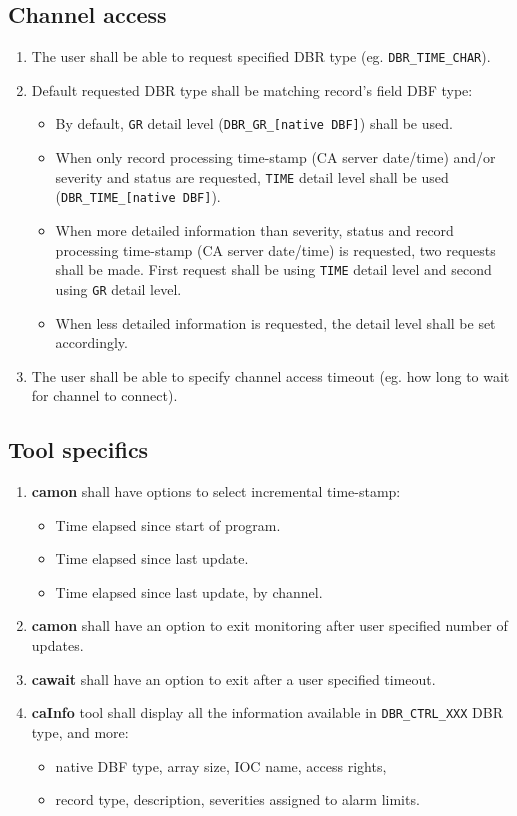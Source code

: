 \documentclass[12pt,a4paper]{article}
\begin{document}
\subsection{Channel access}
\begin{enumerate}
	\item The user shall be able to request specified DBR type (eg. \texttt{DBR\_TIME\_CHAR}).
	\item Default requested DBR type shall be matching record's field DBF type:
	\begin{itemize}
		\item By default, \texttt{GR} detail level (\texttt{DBR\_GR\_[native DBF]}) shall be used.
		\item When only record processing time-stamp (CA server date/time) and/or severity and status are requested, \texttt{TIME} detail level shall be used (\texttt{DBR\_TIME\_[native DBF]}).
		\item When more detailed information than severity, status and record processing time-stamp (CA server date/time) is requested, two requests shall be made. First request shall be using \texttt{TIME} detail level and second using \texttt{GR} detail level.
		\item When less detailed information is requested, the detail level shall be set accordingly.
	\end{itemize}
	\item The user shall be able to specify channel access timeout (eg. how long to wait for channel to connect).
\end{enumerate}

\subsection{Tool specifics}
\begin{enumerate}
	\item \textbf{camon} shall have options to select incremental time-stamp:
	\begin{itemize}
		\item Time elapsed since start of program.
		\item Time elapsed since last update.
		\item Time elapsed since last update, by channel.
	\end{itemize}
	\item \textbf{camon} shall have an option to exit monitoring after user specified number of updates.
	\item \textbf{cawait} shall have an option to exit after a user specified timeout.
	\item \textbf{caInfo} tool shall display all the information available in \texttt{DBR\_CTRL\_XXX} DBR type, and more:
	\begin{itemize}
		\item native DBF type, array size, IOC name, access rights,
		\item record type, description, severities assigned to alarm limits.
	\end{itemize}
\end{enumerate}
\end{document}
